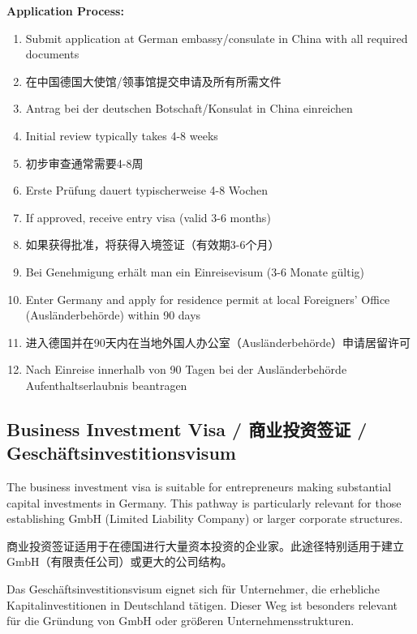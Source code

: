 \textbf{Application Process:}
\begin{enumerate}
    \item Submit application at German embassy/consulate in China with all required documents
    \item 在中国德国大使馆/领事馆提交申请及所有所需文件
    \item Antrag bei der deutschen Botschaft/Konsulat in China einreichen
    \item Initial review typically takes 4-8 weeks
    \item 初步审查通常需要4-8周
    \item Erste Prüfung dauert typischerweise 4-8 Wochen
    \item If approved, receive entry visa (valid 3-6 months)
    \item 如果获得批准，将获得入境签证（有效期3-6个月）
    \item Bei Genehmigung erhält man ein Einreisevisum (3-6 Monate gültig)
    \item Enter Germany and apply for residence permit at local Foreigners' Office (Ausländerbehörde) within 90 days
    \item 进入德国并在90天内在当地外国人办公室（Ausländerbehörde）申请居留许可
    \item Nach Einreise innerhalb von 90 Tagen bei der Ausländerbehörde Aufenthaltserlaubnis beantragen
\end{enumerate}

\subsection{Business Investment Visa / 商业投资签证 / Geschäftsinvestitionsvisum}

The business investment visa is suitable for entrepreneurs making substantial capital investments in Germany. This pathway is particularly relevant for those establishing GmbH (Limited Liability Company) or larger corporate structures.

商业投资签证适用于在德国进行大量资本投资的企业家。此途径特别适用于建立GmbH（有限责任公司）或更大的公司结构。

Das Geschäftsinvestitionsvisum eignet sich für Unternehmer, die erhebliche Kapitalinvestitionen in Deutschland tätigen. Dieser Weg ist besonders relevant für die Gründung von GmbH oder größeren Unternehmensstrukturen.

